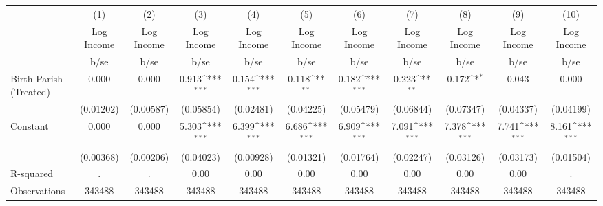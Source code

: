 {
\def\sym#1{\ifmmode^{#1}\else\(^{#1}\)\fi}
\begin{tabular}{l*{10}{c}}
\hline\hline
                    &\multicolumn{1}{c}{(1)}&\multicolumn{1}{c}{(2)}&\multicolumn{1}{c}{(3)}&\multicolumn{1}{c}{(4)}&\multicolumn{1}{c}{(5)}&\multicolumn{1}{c}{(6)}&\multicolumn{1}{c}{(7)}&\multicolumn{1}{c}{(8)}&\multicolumn{1}{c}{(9)}&\multicolumn{1}{c}{(10)}\\
                    &\multicolumn{1}{c}{Log Income}&\multicolumn{1}{c}{Log Income}&\multicolumn{1}{c}{Log Income}&\multicolumn{1}{c}{Log Income}&\multicolumn{1}{c}{Log Income}&\multicolumn{1}{c}{Log Income}&\multicolumn{1}{c}{Log Income}&\multicolumn{1}{c}{Log Income}&\multicolumn{1}{c}{Log Income}&\multicolumn{1}{c}{Log Income}\\
                    &        b/se         &        b/se         &        b/se         &        b/se         &        b/se         &        b/se         &        b/se         &        b/se         &        b/se         &        b/se         \\
\hline
Birth Parish (Treated)&       0.000         &       0.000         &       0.913\sym{***}&       0.154\sym{***}&       0.118\sym{**} &       0.182\sym{***}&       0.223\sym{**} &       0.172\sym{*}  &       0.043         &       0.000         \\
                    &   (0.01202)         &   (0.00587)         &   (0.05854)         &   (0.02481)         &   (0.04225)         &   (0.05479)         &   (0.06844)         &   (0.07347)         &   (0.04337)         &   (0.04199)         \\
Constant            &       0.000         &       0.000         &       5.303\sym{***}&       6.399\sym{***}&       6.686\sym{***}&       6.909\sym{***}&       7.091\sym{***}&       7.378\sym{***}&       7.741\sym{***}&       8.161\sym{***}\\
                    &   (0.00368)         &   (0.00206)         &   (0.04023)         &   (0.00928)         &   (0.01321)         &   (0.01764)         &   (0.02247)         &   (0.03126)         &   (0.03173)         &   (0.01504)         \\
\hline
R-squared           &           .         &           .         &        0.00         &        0.00         &        0.00         &        0.00         &        0.00         &        0.00         &        0.00         &           .         \\
Observations        &      343488         &      343488         &      343488         &      343488         &      343488         &      343488         &      343488         &      343488         &      343488         &      343488         \\

\end{tabular}}

